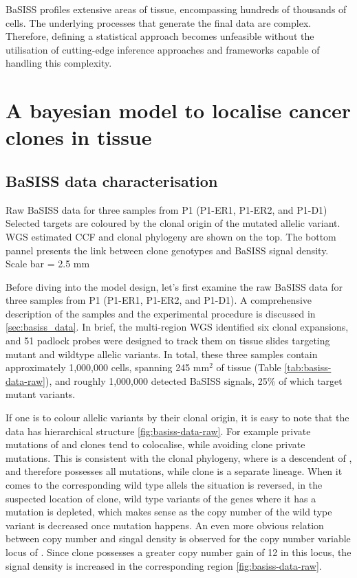 \ac{BaSISS} profiles extensive areas of tissue, encompassing hundreds of thousands of cells. The underlying processes that generate the final data are complex. Therefore, defining a statistical approach becomes unfeasible without the utilisation of cutting-edge inference approaches and frameworks capable of handling this complexity.

\section{A bayesian model to localise cancer clones in tissue}
\subsection{BaSISS data characterisation}
\label{sec:bassis-data-brief}

    {Raw \ac{BaSISS} data for three samples from P1 (P1-ER1, P1-ER2, and P1-D1)}
    {Selected targets are coloured by the clonal origin of the mutated allelic variant. \ac{WGS} estimated \acl{CCF} and clonal phylogeny are shown on the top. The bottom pannel presents the link between clone genotypes and \ac{BaSISS} signal density. Scale bar = 2.5 mm}

Before diving into the model design, let's first examine the raw \ac{BaSISS} data for three samples from P1 (P1-ER1, P1-ER2, and P1-D1). A comprehensive description of the samples and the experimental procedure is discussed in \cref{sec:basiss_data}. In brief, the multi-region \ac{WGS} identified six clonal expansions, and 51 padlock probes were designed to track them on tissue slides targeting mutant and wildtype allelic variants. In total, these three samples contain approximately 1,000,000 cells, spanning 245 mm\(^2\) of tissue (Table \cref{tab:basiss-data-raw}), and roughly 1,000,000 detected \ac{BaSISS} signals, 25\% of which target mutant variants.

If one is to colour allelic variants by their clonal origin, it is easy to note that the data has hierarchical structure \cref{fig:basiss-data-raw}. For example private mutations of  and  clones tend to colocalise, while avoiding  clone private mutations. This is consistent with the clonal phylogeny, where  is a descendent of , and therefore possesses all  mutations, while  clone is a separate lineage. When it comes to the corresponding wild type allels the situation is reversed, in the suspected location of  clone, wild type variants of the genes where it has a mutation is depleted, which makes sense as the copy number of the wild type variant is decreased once mutation happens. An even more obvious relation between copy number and singal density is observed for the copy number variable locus of . Since  clone possesses a greater copy number gain of 12 in this locus, the signal density is increased in the corresponding region \cref{fig:basiss-data-raw}. 

